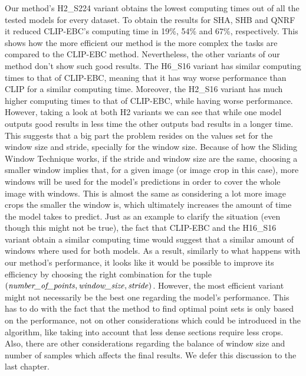 Our method's H2\_S224 variant obtains the lowest computing times out of all the tested models for every dataset. To obtain the results for SHA, SHB and QNRF it reduced CLIP-EBC's computing time in 19\%, 54\% and 67\%, respectively. This shows how the more efficient our method is the more complex the tasks are compared to the CLIP-EBC method. Nevertheless, the other variants of our method don't show such good results. The H6\_S16 variant has similar computing times to that of CLIP-EBC, meaning that it has way worse performance than CLIP for a similar computing time. Moreover, the H2\_S16 variant has much higher computing times to that of CLIP-EBC, while having worse performance. However, taking a look at both H2 variants we can see that while one model outputs good results in less time the other outputs bad results in a longer time. This suggests that a big part the problem resides on the values set for the window size and stride, specially for the window size. Because of how the Sliding Window Technique works, if the stride and window size are the same, choosing a smaller window implies that, for a given image (or image crop in this case), more windows will be used for the model's predictions in order to cover the whole image with windows. This is almost the same as considering a lot more image crops the smaller the window is, which ultimately increases the amount of time the model takes to predict. Just as an example to clarify the situation (even though this might not be true), the fact that CLIP-EBC and the H16\_S16 variant obtain a similar computing time would suggest that a similar amount of windows where used for both models.
As a result, similarly to what happens with our method's performance, it looks like it would be possible to improve its efficiency by choosing the right combination for the tuple $(\text{\textit{number\_of\_points}}, \text{\textit{window\_size}}, \text{\textit{stride}})$. However, the most efficient variant might not necessarily be the best one regarding the model's performance.%
This has to do with the fact that the method to find optimal point sets is only based on the performance, not on other considerations which could be introduced in the algorithm, like taking into account that less dense sections require less crops. Also, there are other considerations regarding the balance of window size and number of samples which affects the final results. We defer this discussion to the last chapter.







